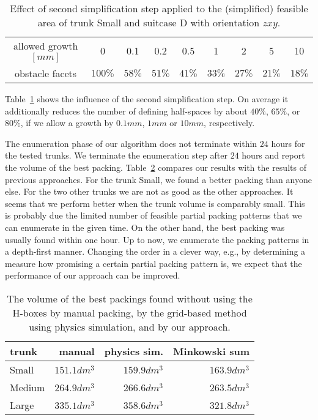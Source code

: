 \documentclass{article}
\newcommand{\dm}{dm}
\newcounter{algo}
\newcommand{\TSmall}{{\sc Small}}
\newcommand{\TMedium}{{\sc Medium}}
\newcommand{\TLarge}{{\sc Large}}
\begin{document}
\begin{table}[t]
\center
\begin{tabular} {|c|cccccccc|}
\hline
allowed growth $[mm]$ & 0 & 0.1 & 0.2 & 0.5 & 1 & 2 & 5 & 10 \\ 
obstacle facets & $100\%$ & $58\%$ & $51\%$ & $41\%$ & $33\%$ & $27\%$ & $21\%$ & $18\%$ \\
\hline
\end{tabular}
\vspace{1mm}
\caption{ \label{table:secondSimplificationStep} Effect of second
simplification step applied to the (simplified) feasible area of trunk
{\TSmall} and suitcase D with orientation $zxy$.}
\end{table}

Table~\ref{table:secondSimplificationStep} shows the influence of the
second simplification step. On average it additionally reduces the
number of defining half-spaces by about $40\%$, $65\%$, or $80\%$, if
we allow a growth by $0.1mm$, $1mm$ or $10mm$, respectively. 

The enumeration phase of our algorithm does not terminate within $24$
hours for the tested trunks. We terminate the enumeration step after
$24$ hours and report the volume of the best
packing. Table~\ref{table:quality} compares our results with the
results of previous approaches. For the trunk {\TSmall}, we found a
better packing than anyone else. For the two other trunks we are not
as good as the other approaches. It seems that we perform better when
the trunk volume is comparably small. This is probably due the limited
number of feasible partial packing patterns that we can enumerate in
the given time. On the other hand, the best packing was usually found
within one hour. Up to now, we enumerate the packing patterns in a
depth-first manner. Changing the order in a clever way, e.g., by
determining a measure how promising a certain partial packing pattern
is, we expect that the performance of our approach can be improved.

\begin{table}[t]
\begin{center}
\begin{tabular}{|l|r|r|r|}
\hline
trunk & manual & physics sim. & Minkowski sum \\
\hline
\TSmall  & $151.1 \dm^3$ & $159.9 \dm^3$ & $163.9 \dm^3$\\
\TMedium & $264.9 \dm^3$ & $266.6 \dm^3$ & $263.5 \dm^3$\\
\TLarge  & $335.1 \dm^3$ & $358.6 \dm^3$ & $321.8 \dm^3$\\
\hline
\end{tabular}
\vspace{3mm}
\caption{The volume of the best packings found without using
the H-boxes by manual packing, by the grid-based method using physics
simulation, and by our approach.}
\label{table:quality}
\end{center}
\end{table}
\end{document}
